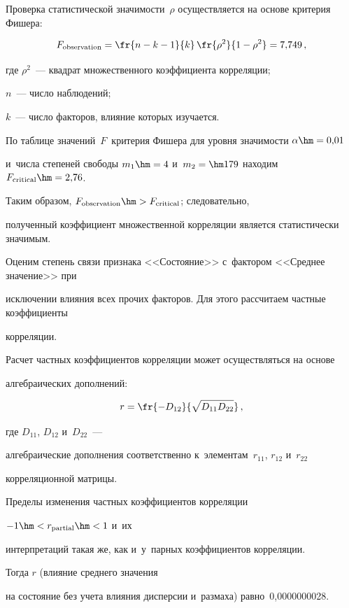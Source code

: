 Проверка статистической значимости~$\rho$ осуществляется на основе критерия Фишера:

$$

F_{\mathrm{observation}}=\fr{n-k-1}{k} \, \fr{\rho^2}{1-\rho^2} = 7{,}749\,,

$$

где $\rho^2$~--- квадрат множественного коэффициента корреляции;

$n$~--- число наблюдений;

$k$~--- число факторов, влияние которых изучается.



По таблице значений~$F$~критерия Фишера для уровня значимости $\alpha\hm=0{,}01$ 

и~числа степеней свободы $m_1\hm=4$ и~$m_2=\hm179$ находим $F_{\mathrm{critical}}\hm = 2{,}76$. 

Таким образом, $F_{\mathrm{observation}}\hm > F_{\mathrm{critical}}$; следовательно, 

полученный коэффициент множественной корреляции является статистически значимым.



Оценим степень связи признака <<Состояние>> с~фактором <<Среднее значение>> при

исключении влияния всех прочих факторов. Для этого рассчитаем частные коэффициенты 

корреляции.



Расчет частных коэффициентов корреляции может осуществляться на основе

алгебраических дополнений:

$$

r=\fr{-D_{12}}{\sqrt{D_{11} D_{22}}} \,,

$$

где  $D_{11}$, $D_{12}$ и~$D_{22}$~--- 

алгебраические дополнения соответственно к~элементам~$r_{11}$, $r_{12}$ и~$r_{22}$

корреляционной матрицы.

Пределы изменения частных коэффициентов корреляции 

$-1 \hm< r_{\mathrm{partial}}\hm < 1$ и~их

интерпретаций такая же, как и~у~парных коэффициентов корреляции.



 Тогда $r$ (влияние среднего значения 

 на состояние без учета влияния дисперсии и~размаха) равно~0,0000000028.



